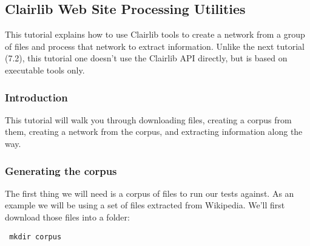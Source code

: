 \subsection {Clairlib Web Site Processing Utilities}


 This tutorial explains how to use Clairlib tools to create a network from a group of files and process that network to extract information. Unlike the next tutorial (7.2), this tutorial one doesn't use the Clairlib API directly, but is based on executable tools only.

\subsubsection{Introduction}


This tutorial will walk you through downloading files, creating a corpus from them, creating a network from the corpus, and extracting information along the way.  

\subsubsection{Generating the corpus}


The first thing we will need is a corpus of files to run our tests against.  As an example we will be using a set of files extracted from Wikipedia.  We'll first download those files into a folder:

\begin{verbatim}
 mkdir corpus
\end{verbatim}


